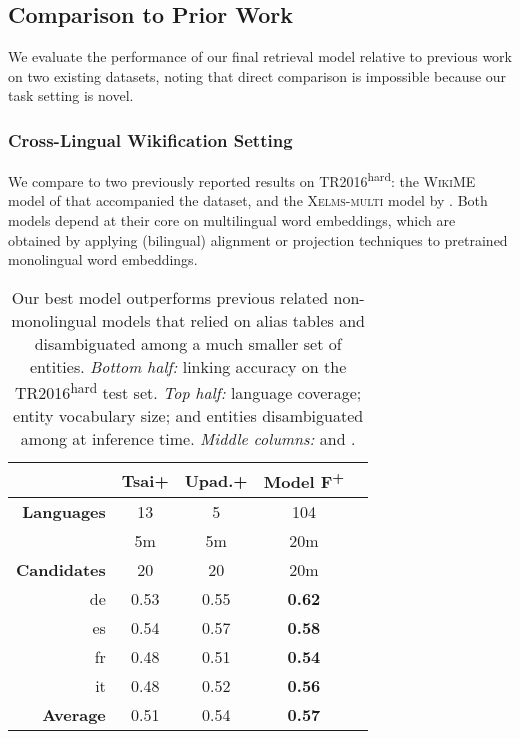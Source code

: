 \documentclass[11pt,a4paper]{article}
\newcommand*{\TR}{TR2016\textsuperscript{hard}}
\begin{document}
\subsection{Comparison to Prior Work}\label{sec:eval_compare_to_prior_work}
We evaluate the performance of our final retrieval model relative to previous work on two existing datasets,
noting that direct comparison is impossible because our task setting is novel.

\subsubsection{Cross-Lingual Wikification Setting}\label{sec:eval_xel}
We compare to two previously reported results on \TR:
the \textsc{WikiME} model of  that accompanied the dataset, and
the \textsc{Xelms-multi} model by .
Both models depend at their core on multilingual word embeddings, which are obtained by applying (bilingual) alignment or projection techniques to pretrained monolingual word embeddings.

\begin{table}
\small
\centering
\begin{tabular}{r cccc} \toprule
 & \textbf{Tsai+} & \textbf{Upad.+} & \textbf{Model F\textsuperscript{+}}\\ \midrule
\textbf{Languages} & 13 & 5 & 104 \\ 
\textbf{} & 5m & 5m & 20m \\
\textbf{Candidates}  & 20 & 20 & 20m \\ \midrule
de & 0.53 & 0.55 & \textbf{0.62} \\
es & 0.54 & 0.57 & \textbf{0.58} \\
fr & 0.48 & 0.51 & \textbf{0.54} \\
it & 0.48 & 0.52 & \textbf{0.56} \\ \midrule
\textbf{Average} & 0.51 & 0.54 & \textbf{0.57} \\ \bottomrule
\end{tabular}
\caption{Our best model outperforms previous related non-monolingual models that relied on alias tables and disambiguated among a much smaller set of entities.
\emph{Bottom half:} linking accuracy on the \TR{} test set. 
\emph{Top half:} language coverage; entity vocabulary size; and entities disambiguated among at inference time.
\emph{Middle columns:} \citep{tsai-roth-2016-cross} and \citep{ upadhyay-etal-2018-joint}.
\label{tab:sota}}
\end{table}
\end{document}
